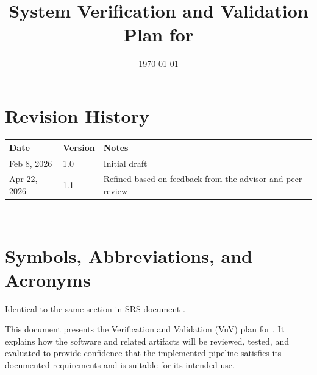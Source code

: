 \documentclass[12pt, titlepage]{article}
\begin{document}
\title{System Verification and Validation Plan for \progname{}} 
\author{\authname}
\date{\today}
	
\maketitle









\section*{Revision History}


\begin{tabularx}{\textwidth}{p{3cm}p{2cm}X}
\toprule {\bf Date} & {\bf Version} & {\bf Notes}\\
\midrule
    Feb 8, 2026 & 1.0 & Initial draft \\
    Apr 22, 2026 & 1.1 & Refined based on feedback from the advisor and peer review \\
\bottomrule
\end{tabularx}
~\\


\newpage


\tableofcontents


\newpage








\section{Symbols, Abbreviations, and Acronyms}


Identical to the same section in SRS document \citep{SRS}.




\newpage


This document presents the Verification and Validation (VnV) plan for \progname{}. It explains how the software and related artifacts will be reviewed, tested, and evaluated to provide confidence that the implemented pipeline satisfies its documented requirements and is suitable for its intended use.
\end{document}
